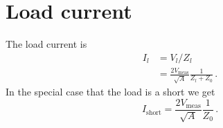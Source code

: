 \documentclass[twocolumn]{article}
\begin{document}
\section{Load current}

The load current is
\begin{align}
I_l
&= V_l / Z_l \nonumber \\
&= \frac{2 V_\text{meas}}{\sqrt{A}} \frac{1}{Z_l + Z_0} \, .
\end{align}
In the special case that the load is a short we get
\begin{equation}
I_\text{short} = \frac{2 V_\text{meas}}{\sqrt{A}} \frac{1}{Z_0} \, .
\end{equation}
\end{document}
